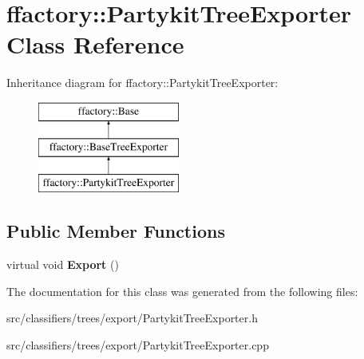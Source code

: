 \hypertarget{classffactory_1_1_partykit_tree_exporter}{\section{ffactory\-:\-:Partykit\-Tree\-Exporter Class Reference}
\label{classffactory_1_1_partykit_tree_exporter}
}
Inheritance diagram for ffactory\-:\-:Partykit\-Tree\-Exporter\-:\begin{figure}[H]
\begin{center}
\leavevmode
\includegraphics[height=3.000000cm]{classffactory_1_1_partykit_tree_exporter}
\end{center}
\end{figure}
\subsection*{Public Member Functions}
\begin{DoxyCompactItemize}
\item 
\hypertarget{classffactory_1_1_partykit_tree_exporter_a0d1d8157cace997c4a2eab850257eb2e}{virtual void {\bfseries Export} ()}\label{classffactory_1_1_partykit_tree_exporter_a0d1d8157cace997c4a2eab850257eb2e}

\end{DoxyCompactItemize}


The documentation for this class was generated from the following files\-:\begin{DoxyCompactItemize}
\item 
src/classifiers/trees/export/Partykit\-Tree\-Exporter.\-h\item 
src/classifiers/trees/export/Partykit\-Tree\-Exporter.\-cpp\end{DoxyCompactItemize}
